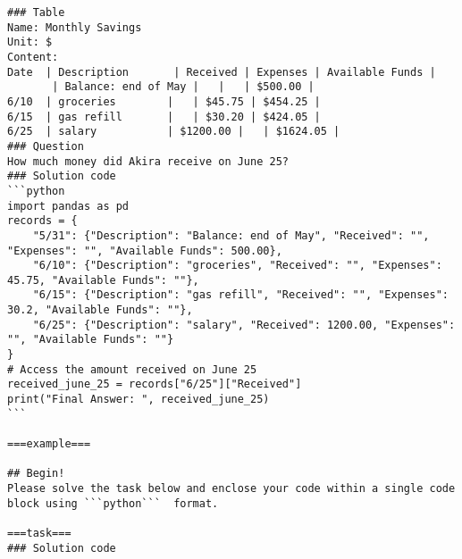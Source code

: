 \begin{tcolorbox}[title=Prompt on TabMWP, breakable, width=\textwidth,top=0mm]
\begin{Verbatim}[breaklines, fontsize=\footnotesize]
### Table
Name: Monthly Savings  
Unit: $  
Content:  
Date  | Description       | Received | Expenses | Available Funds |
       | Balance: end of May |   |   | $500.00 |
6/10  | groceries        |   | $45.75 | $454.25 |
6/15  | gas refill       |   | $30.20 | $424.05 |
6/25  | salary           | $1200.00 |   | $1624.05 |
### Question
How much money did Akira receive on June 25?
### Solution code
```python
import pandas as pd
records = {
    "5/31": {"Description": "Balance: end of May", "Received": "", "Expenses": "", "Available Funds": 500.00},
    "6/10": {"Description": "groceries", "Received": "", "Expenses": 45.75, "Available Funds": ""},
    "6/15": {"Description": "gas refill", "Received": "", "Expenses": 30.2, "Available Funds": ""},
    "6/25": {"Description": "salary", "Received": 1200.00, "Expenses": "", "Available Funds": ""}
}
# Access the amount received on June 25
received_june_25 = records["6/25"]["Received"]
print("Final Answer: ", received_june_25)
```

===example===

## Begin!
Please solve the task below and enclose your code within a single code block using ```python```  format.

===task===
### Solution code
\end{Verbatim}
\end{tcolorbox}








